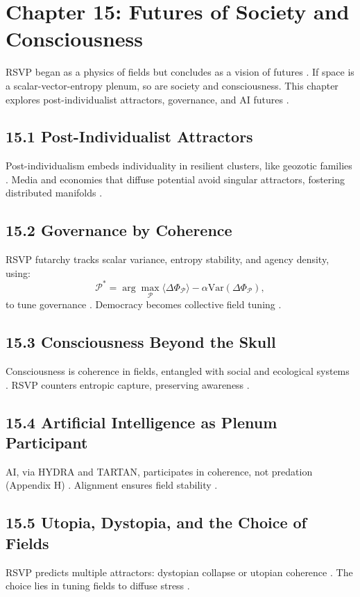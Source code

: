 \documentclass[12pt]{article}
\begin{document}
\section*{Chapter 15: Futures of Society and Consciousness}
RSVP began as a physics of fields but concludes as a vision of futures \citep{whitehead1978}. If space is a scalar-vector-entropy plenum, so are society and consciousness. This chapter explores post-individualist attractors, governance, and AI futures \citep{deleuze1987}.
\subsection*{15.1 Post-Individualist Attractors}
Post-individualism embeds individuality in resilient clusters, like geozotic families \citep{deleuze1987}. Media and economies that diffuse potential avoid singular attractors, fostering distributed manifolds \citep{zuboff2019}.
\subsection*{15.2 Governance by Coherence}
RSVP futarchy tracks scalar variance, entropy stability, and agency density, using:
\[
\mathcal{P}^* = \arg \max_{\mathcal{P}} \langle \Delta \Phi_{\mathcal{P}} \rangle - \alpha \mathrm{Var}(\Delta \Phi_{\mathcal{P}}),
\]
to tune governance \citep{hanson2003}. Democracy becomes collective field tuning \citep{ortega1957}.
\subsection*{15.3 Consciousness Beyond the Skull}
Consciousness is coherence in fields, entangled with social and ecological systems \citep{tononi2004}. RSVP counters entropic capture, preserving awareness \citep{lanier2018}.
\subsection*{15.4 Artificial Intelligence as Plenum Participant}
AI, via HYDRA and TARTAN, participates in coherence, not predation (Appendix H) \citep{bird1988}. Alignment ensures field stability \citep{friston2010}.
\subsection*{15.5 Utopia, Dystopia, and the Choice of Fields}
RSVP predicts multiple attractors: dystopian collapse or utopian coherence \citep{zuboff2019}. The choice lies in tuning fields to diffuse stress \citep{deleuze1987}.
\end{document}
